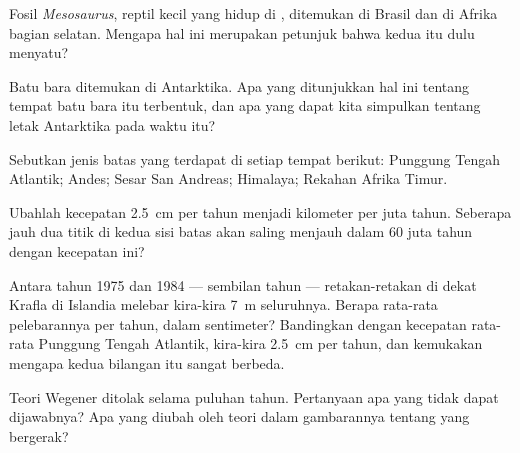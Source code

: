 \begin{exercise}[$\star$]\label{exo:g7:plate-tectonics:4}
Fosil \emph{Mesosaurus}, reptil kecil yang hidup di , ditemukan
di Brasil dan di Afrika bagian selatan. Mengapa hal ini merupakan petunjuk
bahwa kedua  itu dulu menyatu?
\end{exercise}

\begin{exercise}[$\star\star$]\label{exo:g7:plate-tectonics:5}
Batu bara ditemukan di Antarktika. Apa yang ditunjukkan hal ini tentang
 tempat batu bara itu terbentuk, dan apa yang dapat kita simpulkan
tentang letak Antarktika pada waktu itu?
\end{exercise}

\begin{exercise}[$\star\star$]\label{exo:g7:plate-tectonics:6}
Sebutkan jenis batas yang terdapat di setiap tempat berikut: Punggung
Tengah Atlantik;  Andes; Sesar San Andreas; Himalaya; Rekahan
Afrika Timur.
\end{exercise}

\begin{exercise}[$\star\star$]\label{exo:g7:plate-tectonics:7}
Ubahlah kecepatan \qty{2.5}{cm} per tahun menjadi kilometer per juta tahun.
Seberapa jauh dua titik di kedua sisi batas akan saling menjauh dalam 60
juta tahun dengan kecepatan ini?
\end{exercise}

\begin{exercise}[$\star\star$]\label{exo:g7:plate-tectonics:8}
Antara tahun 1975 dan 1984 --- sembilan tahun --- retakan-retakan di dekat
 Krafla di Islandia melebar kira-kira \qty{7}{m} seluruhnya.
Berapa rata-rata pelebarannya per tahun, dalam sentimeter? Bandingkan
dengan kecepatan rata-rata Punggung Tengah Atlantik, kira-kira
\qty{2.5}{cm} per tahun, dan kemukakan mengapa kedua bilangan itu sangat
berbeda.
\end{exercise}

\begin{exercise}[$\star\star$]\label{exo:g7:plate-tectonics:9}
Teori Wegener ditolak selama puluhan tahun. Pertanyaan apa yang tidak dapat
dijawabnya? Apa yang diubah oleh teori  dalam gambarannya
tentang  yang bergerak?
\end{exercise}

